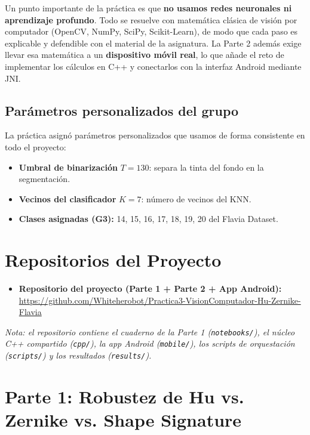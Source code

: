 \documentclass[12pt,a4paper]{article}
\begin{document}
Un punto importante de la práctica es que \textbf{no usamos redes neuronales ni aprendizaje profundo}. Todo se resuelve con matemática clásica de visión por computador (OpenCV, NumPy, SciPy, Scikit-Learn), de modo que cada paso es explicable y defendible con el material de la asignatura. La Parte 2 además exige llevar esa matemática a un \textbf{dispositivo móvil real}, lo que añade el reto de implementar los cálculos en C++ y conectarlos con la interfaz Android mediante JNI.

\subsection*{Parámetros personalizados del grupo}

La práctica asignó parámetros personalizados que usamos de forma consistente en todo el proyecto:
\begin{itemize}
  \item \textbf{Umbral de binarización} $T = 130$: separa la tinta del fondo en la segmentación.
  \item \textbf{Vecinos del clasificador} $K = 7$: número de vecinos del KNN.
  \item \textbf{Clases asignadas (G3):} 14, 15, 16, 17, 18, 19, 20 del Flavia Dataset.
\end{itemize}

\section*{Repositorios del Proyecto}

\begin{itemize}
  \item \textbf{Repositorio del proyecto (Parte 1 + Parte 2 + App Android):}\\
        \url{https://github.com/Whiteherobot/Practica3-VisionComputador-Hu-Zernike-Flavia}
\end{itemize}

\textit{Nota: el repositorio contiene el cuaderno de la Parte 1 (\texttt{notebooks/}), el núcleo C++ compartido (\texttt{cpp/}), la app Android (\texttt{mobile/}), los scripts de orquestación (\texttt{scripts/}) y los resultados (\texttt{results/}).}

\section{Parte 1: Robustez de Hu vs. Zernike vs. Shape Signature}
\end{document}
